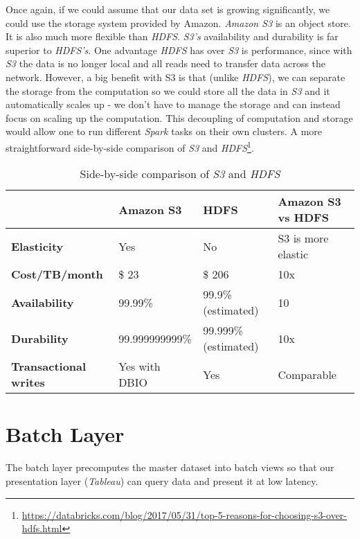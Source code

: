 \documentclass[format=acmsmall, review=false, screen=true]{acmart}
\begin{document}
Once again, if we could assume that our data set is growing significantly, we could use the storage system provided by Amazon. \textit{Amazon S3} is an object store. It is also much more flexible than \textit{HDFS}. \textit{S3’s} availability and durability is far superior to \textit{HDFS’s}. One advantage \textit{HDFS} has over \textit{S3} is performance, since with \textit{S3} the data is no longer local and all reads need to transfer data across the network. However, a big benefit with S3 is that (unlike \textit{HDFS}), we can separate the storage from the computation so we could store all the data in \textit{S3} and it automatically scales up - we don’t have to manage the storage and can instead focus on scaling up the computation. This decoupling of computation and storage would allow one to run different \textit{Spark} tasks on their own clusters. A more straightforward side-by-side comparison of \textit{S3} and \textit{HDFS}\footnote{\url{https://databricks.com/blog/2017/05/31/top-5-reasons-for-choosing-s3-over-hdfs.html}}.

\begin{table}[H]
\centering
\caption{Side-by-side comparison of \textit{S3} and \textit{HDFS}}
\label{my-label}
\begin{tabular}{@{}llll@{}}
\toprule
\textbf{}                     & \textbf{Amazon S3} & \textbf{HDFS}       & \textbf{Amazon S3 vs HDFS} \\ \midrule
\textbf{Elasticity}           & Yes                & No                  & S3 is more elastic         \\
\textbf{Cost/TB/month}        & \$ 23              & \$ 206              & 10x                        \\
\textbf{Availability}         & 99.99\%            & 99.9\%(estimated)   & 10                         \\
\textbf{Durability}           & 99.999999999\%     & 99.999\%(estimated) & 10x                        \\ \midrule
\textbf{Transactional writes} & Yes with DBIO      & Yes                 & Comparable                
\end{tabular}
\end{table}



\section{Batch Layer}

The batch layer precomputes the master dataset into batch views so that our presentation layer (\textit{Tableau}) can query data and present it at low latency.
\end{document}
